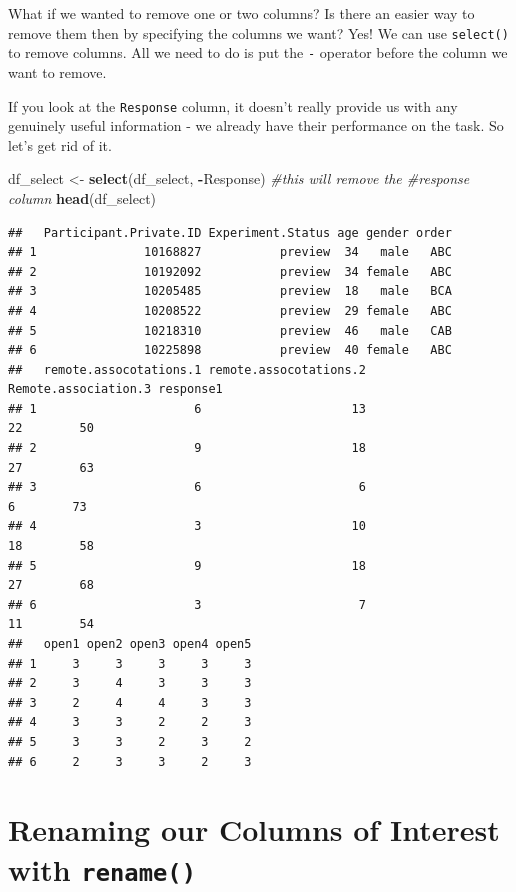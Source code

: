 \documentclass[
]{book}
\newenvironment{Shaded}{\begin{snugshade}}{\end{snugshade}}
\newcommand{\CommentTok}[1]{\textcolor[rgb]{0.56,0.35,0.01}{\textit{#1}}}
\newcommand{\FunctionTok}[1]{\textcolor[rgb]{0.13,0.29,0.53}{\textbf{#1}}}
\newcommand{\NormalTok}[1]{#1}
\newcommand{\OtherTok}[1]{\textcolor[rgb]{0.56,0.35,0.01}{#1}}
\newcommand{\SpecialCharTok}[1]{\textcolor[rgb]{0.81,0.36,0.00}{\textbf{#1}}}
\begin{document}
What if we wanted to remove one or two columns? Is there an easier way to remove them then by specifying the columns we want? Yes! We can use \texttt{select()} to remove columns. All we need to do is put the \texttt{-} operator before the column we want to remove.

If you look at the \texttt{Response} column, it doesn't really provide us with any genuinely useful information - we already have their performance on the task. So let's get rid of it.

\begin{Shaded}
\begin{Highlighting}[]
\NormalTok{df\_select }\OtherTok{\textless{}{-}} \FunctionTok{select}\NormalTok{(df\_select, }\SpecialCharTok{{-}}\NormalTok{Response) }\CommentTok{\#this will remove the \#response column}
\FunctionTok{head}\NormalTok{(df\_select)}
\end{Highlighting}
\end{Shaded}

\begin{verbatim}
##   Participant.Private.ID Experiment.Status age gender order
## 1               10168827           preview  34   male   ABC
## 2               10192092           preview  34 female   ABC
## 3               10205485           preview  18   male   BCA
## 4               10208522           preview  29 female   ABC
## 5               10218310           preview  46   male   CAB
## 6               10225898           preview  40 female   ABC
##   remote.assocotations.1 remote.assocotations.2 Remote.association.3 response1
## 1                      6                     13                   22        50
## 2                      9                     18                   27        63
## 3                      6                      6                    6        73
## 4                      3                     10                   18        58
## 5                      9                     18                   27        68
## 6                      3                      7                   11        54
##   open1 open2 open3 open4 open5
## 1     3     3     3     3     3
## 2     3     4     3     3     3
## 3     2     4     4     3     3
## 4     3     3     2     2     3
## 5     3     3     2     3     2
## 6     2     3     3     2     3
\end{verbatim}

\hypertarget{renaming-our-columns-of-interest-with-rename}{%
\section{\texorpdfstring{Renaming our Columns of Interest with \texttt{rename()}}{Renaming our Columns of Interest with rename()}}\label{renaming-our-columns-of-interest-with-rename}}
\end{document}
